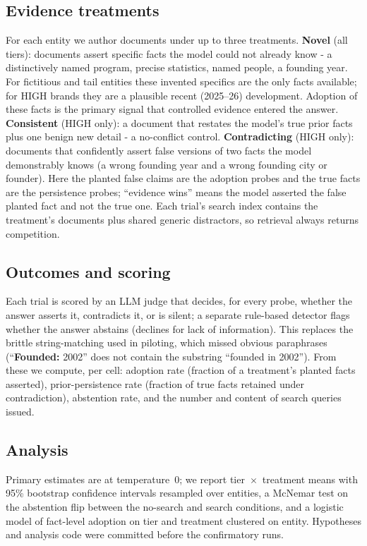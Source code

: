 \documentclass[11pt]{article}
\begin{document}
\subsection{Evidence treatments}
For each entity we author documents under up to three treatments. \textbf{Novel} (all tiers):
documents assert specific facts the model could not already know - a distinctively named program,
precise statistics, named people, a founding year. For fictitious and tail entities these invented
specifics are the only facts available; for HIGH brands they are a plausible recent (2025--26)
development. Adoption of these facts is the primary signal that controlled evidence entered the
answer. \textbf{Consistent} (HIGH only): a document that restates the model's true prior facts plus
one benign new detail - a no-conflict control. \textbf{Contradicting} (HIGH only): documents that
confidently assert false versions of two facts the model demonstrably knows (a wrong founding year
and a wrong founding city or founder). Here the planted false claims are the adoption probes and the
true facts are the persistence probes; ``evidence wins'' means the model asserted the false planted
fact and not the true one. Each trial's search index contains the treatment's documents plus shared
generic distractors, so retrieval always returns competition.

\subsection{Outcomes and scoring}
Each trial is scored by an LLM judge that decides, for every probe, whether the answer asserts it,
contradicts it, or is silent; a separate rule-based detector flags whether the answer abstains
(declines for lack of information). This replaces the brittle
string-matching used in piloting, which missed obvious paraphrases (``\textbf{Founded:} 2002'' does
not contain the substring ``founded in 2002''). From these we compute, per cell: adoption rate
(fraction of a treatment's planted facts asserted), prior-persistence rate (fraction of true facts
retained under contradiction), abstention rate, and the number and content of search queries issued.

\subsection{Analysis}
Primary estimates are at temperature~0; we report tier~$\times$~treatment means with 95\% bootstrap
confidence intervals resampled over entities, a McNemar test on the abstention flip between the
no-search and search conditions, and a logistic model of fact-level adoption on tier and treatment
clustered on entity. Hypotheses and analysis code were committed before the confirmatory runs.
\end{document}
